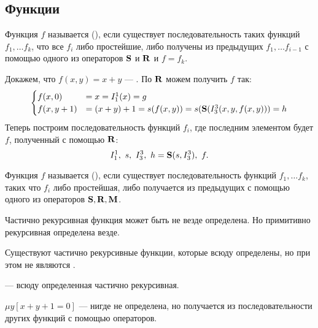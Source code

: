 \subsection{Функции}
\begin{defn}
	Функция $ f$ называется  (\prf),
	если 
	существует последовательность таких функций  $ f_1, \ldots f_k$, что
	все $ f_i$ либо простейшие, либо получены из предыдущих $ f_1, \ldots f_{i-1}$ с помощью одного из операторов $\S$ и $\R$ и $ f = f_k$.
\end{defn}


\begin{ex}\label{ex:1}
	Докажем, что $ f(x, y) = x + y$ --- \prf. По  $ \R$ можем получить $ f$ так:
	\[
	\begin{cases}
		f(x, 0) &= x = I^{1}_{1} (x) =g \\
		f(x, y+1) &= (x + y) + 1 = s(f(x, y)) = s(\S(I^{3}_{3} (x, y, f(x, y))) = h 
	\end{cases}
	\] 
	Теперь построим последовательность функций $ f_i$, где последним элементом будет $ f$, полученный с помощью $ \R$: 
	\[
		I^{1}_{1} , ~s, ~I^{3}_{3} , ~ h = \S(s, I^{3}_{3}) ,~ f
	.\] 
\end{ex}


\begin{defn}
	Функция $ f$ называется  (\crf), если существует последовательность функций $ f_1, \ldots f_k$, таких что $ f_i$ либо простейшая, либо получается из предыдущих с помощью одного из операторов  $ \S, \R, \M$.
\end{defn}

\begin{note}
    Частично рекурсивная функция может быть не везде определена. Но примитивно рекурсивная определена везде.
\end{note}
\begin{note}
    Существуют частично рекурсивные функции, которые всюду определены, но при этом не являются \prf.
\end{note}

\begin{defn}
	 --- всюду определенная частично рекурсивная.
\end{defn}


\begin{ex}
	$ \mu y [x + y + 1 = 0]$ --- нигде не определена, но получается из последовательности других функций с помощью операторов.
\end{ex}



